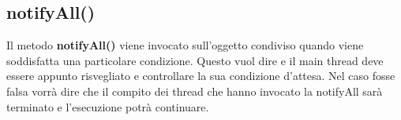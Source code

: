 	\subsection{notifyAll()} %
	\label{sub:notifyall_}
	Il metodo \textbf{notifyAll()} viene invocato sull'oggetto condiviso quando viene soddisfatta una particolare condizione. Questo vuol dire e il main thread deve essere appunto risvegliato e controllare la sua condizione d'attesa. Nel caso fosse falsa vorrà dire che il compito dei thread che hanno invocato la notifyAll sarà terminato e l'esecuzione potrà continuare. 




